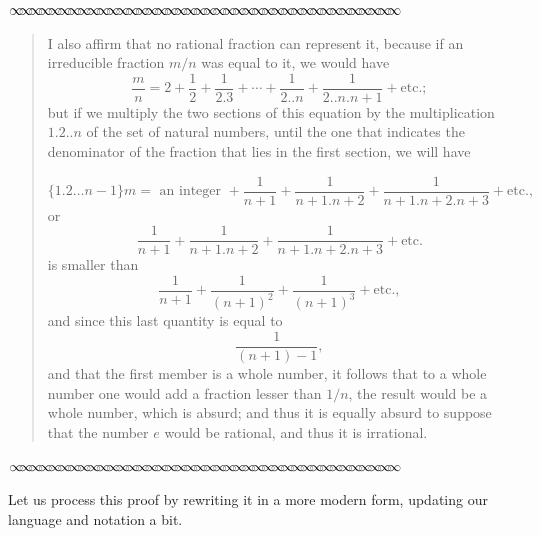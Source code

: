 \documentclass[11pt]{article}
\newcommand{\sep}{\vspace{-3pt}
\begin{center}
{\mathversion{normal}
$\infty \mspace{-5.5mu}\infty \mspace{-5.5mu}\infty \mspace{-5.5mu}\infty \mspace{-5.5mu}
\infty \mspace{-5.5mu}\infty \mspace{-5.5mu}\infty \mspace{-5.5mu}\infty \mspace{-5.5mu}
\infty \mspace{-5.5mu}\infty \mspace{-5.5mu}\infty \mspace{-5.5mu}\infty \mspace{-5.5mu}
\infty \mspace{-5.5mu}\infty \mspace{-5.5mu}\infty \mspace{-5.5mu}\infty \mspace{-5.5mu}
\infty \mspace{-5.5mu}\infty \mspace{-5.5mu}\infty \mspace{-5.5mu}\infty \mspace{-5.5mu}
\infty \mspace{-5.5mu}\infty \mspace{-5.5mu}\infty \mspace{-5.5mu}\infty \mspace{-5.5mu}
\infty \mspace{-5.5mu}\infty \mspace{-5.5mu}\infty \mspace{-5.5mu}\infty \mspace{-5.5mu}
\infty \mspace{-5.5mu}\infty \mspace{-5.5mu}\infty \mspace{-5.5mu}\infty \mspace{-5.5mu}
\infty \mspace{-5.5mu}\infty \mspace{-5.5mu}\infty \mspace{-5.5mu}\infty \mspace{-5.5mu}
\infty \mspace{-5.5mu}\infty \mspace{-5.5mu}\infty \mspace{-5.5mu}\infty \mspace{-5.5mu}$}
\end{center} \vspace*{-5pt}}
\newenvironment{source}%
 {\bigskip \sep \vspace*{-6pt} \begin{quote}
          \begin{sf}   }
   {   \end{sf}     \end{quote} \vspace*{-6pt} \sep \bigskip}%
\begin{document}
\begin{source}
I also affirm that no rational fraction can represent it, because if an irreducible fraction $m/n$ was equal to it, we would have $$\frac{m}{n}=2+\frac{1}{2}+\frac{1}{2.3}+\cdots+\frac{1}{2..n}+\frac{1}{2..n.n+1}+\text{etc.};$$ but if we multiply the two sections of this equation by the multiplication $1.2..n$ of the set of natural numbers, until the one that indicates the denominator of the fraction that lies in the first section, we will have 

$$\lbrace 1.2\ldots n-1 \rbrace m = \text{ an integer } + \frac{1}{n+1}+ \frac{1}{n+1.n+2}+\frac{1}{n+1.n+2.n+3}+\text{etc.},$$ or 
$$\frac{1}{n+1}+ \frac{1}{n+1.n+2}+\frac{1}{n+1.n+2.n+3}+\text{etc.}$$ is smaller than 
$$\frac{1}{n+1}+ \frac{1}{(n+1)^2}+\frac{1}{(n+1)^3}+\text{etc.},$$ and since this last quantity is equal to $$\frac{1}{(n+1)-1},$$ and that the first member is a whole number, it follows that to a whole number one would add a fraction lesser than $1/n$, the result would be a whole number, which is absurd; and thus it is equally absurd to suppose that the number $e$ would be rational, and thus it is irrational. 

\end{source}

Let us process this proof by rewriting it in a more modern form, updating our language and notation a bit.  
\end{document}
